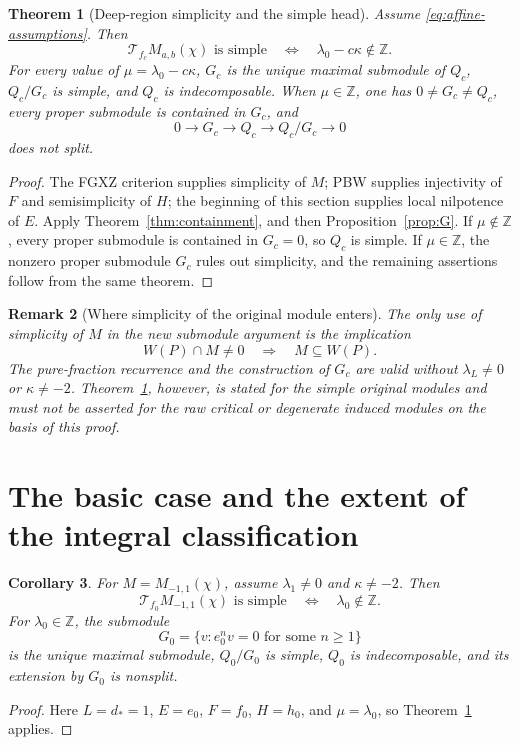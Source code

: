 \documentclass[11pt,a4paper]{article}
\newcommand{\Z}{\mathbb Z}
\newcommand{\T}{\mathcal T}
\theoremstyle{plainupright}
\newtheorem{theorem}{Theorem}[section]
\newtheorem{corollary}[theorem]{Corollary}
\newtheorem{remark}[theorem]{Remark}
\begin{document}
\begin{theorem}[Deep-region simplicity and the simple head]\label{thm:deep}
Assume \eqref{eq:affine-assumptions}. Then
\[
\boxed{\quad
\T_{f_c}M_{a,b}(\chi)\text{ is simple}
\quad\Longleftrightarrow\quad
\lambda_0-c\kappa\notin\Z.
\quad}
\]
For every value of \(\mu=\lambda_0-c\kappa\), \(G_c\) is the unique
maximal submodule of \(Q_c\), \(Q_c/G_c\) is simple, and \(Q_c\)
is indecomposable. When \(\mu\in\Z\), one has \(0\ne G_c\ne Q_c\),
every proper submodule is contained in \(G_c\), and
\begin{equation}\label{eq:nonsplit}
0\longrightarrow G_c\longrightarrow Q_c\longrightarrow Q_c/G_c
\longrightarrow0
\end{equation}
does not split.
\end{theorem}
\begin{proof}
The FGXZ criterion supplies simplicity of \(M\); PBW supplies
injectivity of \(F\) and semisimplicity of \(H\); the beginning of
this section supplies local nilpotence of \(E\).
Apply Theorem~\ref{thm:containment}, and then
Proposition~\ref{prop:G}.
If \(\mu\notin\Z\), every proper submodule is contained in
\(G_c=0\), so \(Q_c\) is simple.
If \(\mu\in\Z\), the nonzero proper submodule \(G_c\) rules out
simplicity, and the remaining assertions follow from the same theorem.
\end{proof}

\begin{remark}[Where simplicity of the original module enters]
The only use of simplicity of \(M\) in the new submodule argument is
the implication
\[
W(P)\cap M\ne0\quad\Longrightarrow\quad M\subseteq W(P).
\]
The pure-fraction recurrence and the construction of \(G_c\) are
valid without \(\lambda_L\ne0\) or \(\kappa\ne-2\).
Theorem~\ref{thm:deep}, however, is stated for the simple original
modules and must not be asserted for the raw critical or degenerate
induced modules on the basis of this proof.
\end{remark}

\section{The basic case and the extent of the integral classification}

\begin{corollary}\label{cor:basic}
For \(M=M_{-1,1}(\chi)\), assume
\(\lambda_1\ne0\) and \(\kappa\ne-2\). Then
\[
\boxed{\quad
\T_{f_0}M_{-1,1}(\chi)\text{ is simple}
\quad\Longleftrightarrow\quad \lambda_0\notin\Z.
\quad}
\]
For \(\lambda_0\in\Z\), the submodule
\[
G_0=\{v:e_0^nv=0\text{ for some }n\ge1\}
\]
is the unique maximal submodule, \(Q_0/G_0\) is simple, \(Q_0\) is
indecomposable, and its extension by \(G_0\) is nonsplit.
\end{corollary}
\begin{proof}
Here \(L=d_*=1\), \(E=e_0\), \(F=f_0\), \(H=h_0\), and
\(\mu=\lambda_0\), so Theorem~\ref{thm:deep} applies.
\end{proof}
\end{document}
